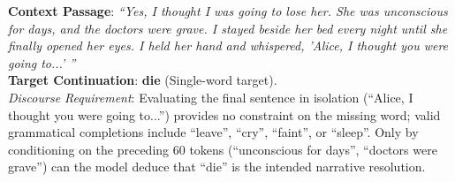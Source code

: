 \documentclass[../../main.tex]{subfiles}
\begin{document}
\begin{center}
\begin{minipage}{0.95\textwidth}
\begin{tcolorbox}[colback=cardBg,colframe=cardLine,arc=2pt,boxrule=0.5pt,title=\textbf{Task Example: Long-Range Narrative Text Completion (LAMBADA)}]
\small\sffamily
\textbf{Context Passage}: \textit{``Yes, I thought I was going to lose her. She was unconscious for days, and the doctors were grave. I stayed beside her bed every night until she finally opened her eyes. I held her hand and whispered, 'Alice, I thought you were going to...' ''} \\
\textbf{Target Continuation}: \textbf{die} (Single-word target). \\
\textit{Discourse Requirement}: Evaluating the final sentence in isolation (``Alice, I thought you were going to...'') provides no constraint on the missing word; valid grammatical completions include ``leave'', ``cry'', ``faint'', or ``sleep''. Only by conditioning on the preceding 60 tokens (``unconscious for days'', ``doctors were grave'') can the model deduce that ``die'' is the intended narrative resolution.
\end{tcolorbox}
\end{minipage}
\end{center}
\end{document}
